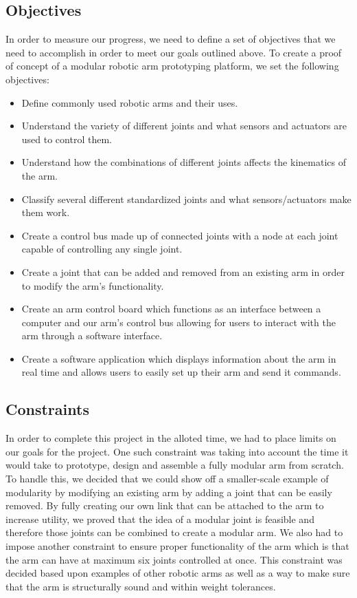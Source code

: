 {\subsection{Objectives}
\noindent In order to measure our progress, we need to define a set of objectives that we need to accomplish in order to meet our goals outlined above. To create a proof of concept of a modular robotic arm prototyping platform, we set the following objectives: 
\begin{itemize}
\item Define commonly used robotic arms and their uses.
\item Understand the variety of different joints and what sensors and actuators are used to control them.
\item Understand how the combinations of different joints affects the kinematics of the arm.
\item Classify several different standardized joints and what sensors/actuators make them work.
\item Create a control bus made up of connected joints with a node at each joint capable of controlling any single joint.
\item Create a joint that can be added and removed from an existing arm in order to modify the arm's functionality.
\item Create an arm control board which functions as an interface between a computer and our arm's control bus allowing for users to interact with the arm through a software interface.
\item Create a software application which displays information about the arm in real time and allows users to easily set up their arm and send it commands.
\end{itemize} 

\subsection{Constraints}
\noindent In order to complete this project in the alloted time, we had to place limits on our goals for the project. One such constraint was taking into account the time it would take to prototype, design and assemble a fully modular arm from scratch. To handle this, we decided that we could show off a smaller-scale example of modularity by modifying an existing arm by adding a joint that can be easily removed. By fully creating our own link that can be attached to the arm to increase utility, we proved that the idea of a modular joint is feasible and therefore those joints can be combined to create a modular arm. We also had to impose another constraint to ensure proper functionality of the arm which is that the arm can have at maximum six joints controlled at once. This constraint was decided based upon examples of other robotic arms as well as a way to make sure that the arm is structurally sound and within weight tolerances.

}
